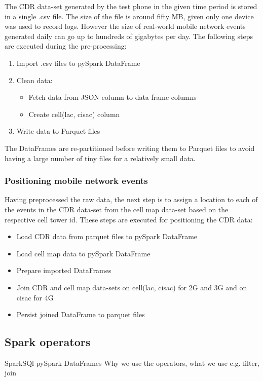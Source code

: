 The CDR data-set generated by the test phone in the given time period is stored in a single .csv file. The size of the file is around fifty MB, given only one device was used to record logs. However the size of real-world mobile network events generated daily can go up to hundreds of gigabytes per day. The following steps are executed during the pre-processing: 
\begin{enumerate}
   \item Import .csv files to pySpark DataFrame
    \item Clean data:
    \begin{itemize}
        \item Fetch data from JSON column to data frame columns
        \item Create cell(lac, cisac) column
    \end{itemize}
    \item Write data to Parquet files
\end{enumerate}

The DataFrames are re-partitioned before writing them to Parquet files to avoid having a large number of tiny files for a relatively small data. 

\subsubsection{Positioning mobile network events}
Having preprocessed the raw data, the next step is to assign a location to each of the events in the CDR data-set from the cell map data-set based on the respective cell tower id. 
These steps are executed for positioning the CDR data:
\begin{itemize}
    \item Load CDR data from parquet files to pySpark DataFrame
    \item Load cell map data to pySpark DataFrame
    \item Prepare imported DataFrames
    \item Join CDR and cell map data-sets on cell(lac, cisac) for 2G and 3G and on cisac for 4G
    \item Persist joined DataFrame to parquet files
\end{itemize}

\subsection{Spark operators}
SparkSQl
pySpark DataFrames
Why we use the operators, what we use 
e.g. filter, join 